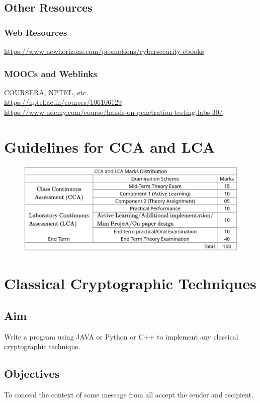 \documentclass[openany]{book}
\begin{document}
\section{Other Resources}
\subsection{Web Resources}
\url{https://www.newhorizons.com/promotions/cybersecurity-ebooks}\\

\noindent
\subsection{MOOCs and Weblinks}
\noindent
COURSERA, NPTEL, etc.\\
\url{https://nptel.ac.in/courses/106106129}\\
\url{https://www.udemy.com/course/hands-on-penetration-testing-labs-30/}

\chapter{Guidelines for CCA and LCA}

\begin{figure}[H]
	\centering
	\includegraphics[width=.99\textwidth]{./cca.png}
\end{figure}
\mainmatter

\chapter{Classical Cryptographic Techniques}

\section{Aim}
Write a program using JAVA or Python or C++ to implement any classical cryptographic
technique.

\section{Objectives}
To conceal the context of some message from all accept the sender and recipient.
\end{document}
